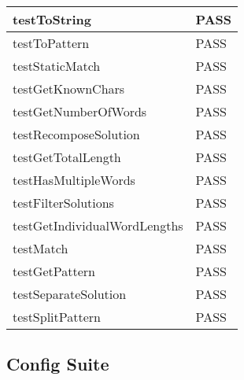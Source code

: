 \begin{longtable}{|L{14cm}|C{2cm}|}
  testToString                                             & PASS \\  \hline
  testToPattern                                            & PASS \\  \hline
  testStaticMatch                                          & PASS \\  \hline
  testGetKnownChars                                        & PASS \\  \hline
  testGetNumberOfWords                                     & PASS \\  \hline
  testRecomposeSolution                                    & PASS \\  \hline
  testGetTotalLength                                       & PASS \\  \hline
  testHasMultipleWords                                     & PASS \\  \hline
  testFilterSolutions                                      & PASS \\  \hline
  testGetIndividualWordLengths                             & PASS \\  \hline
  testMatch                                                & PASS \\  \hline
  testGetPattern                                           & PASS \\  \hline
  testSeparateSolution                                     & PASS \\  \hline
  testSplitPattern                                         & PASS \\  \hline
\end{longtable}


\subsection{Config Suite}
\label{sub:test_config_suite}



